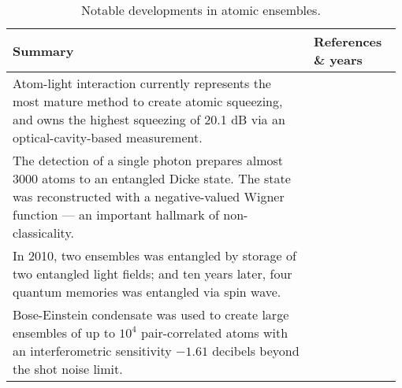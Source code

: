 \begin{table*}[!htbp]
	\begin{tabular}{|p{0.755\linewidth}|p{0.22\linewidth}|}
		\hline
		Summary & References \& years \\
		\hline \hline
		Atom-light interaction currently represents the most mature method to create atomic squeezing, and owns the highest squeezing of 20.1 dB via an optical-cavity-based measurement. & \cite{bib:hosten2016measurement} \\
		\hline
		The detection of a single photon prepares almost 3000 atoms to an entangled Dicke state. The state was reconstructed with a negative-valued Wigner function --- an important hallmark of non-classicality. &  \cite{bib:mcconnell2015entanglement} \\
		\hline
		In 2010, two ensembles was entangled by storage of two entangled light fields; and ten years later, four quantum memories was entangled via spin wave. & \cite{bib:lukin2000entanglement, bib:choi2010entanglement} \\
		\hline
		Bose-Einstein condensate was used to create large ensembles of up to ${10^4}$ pair-correlated atoms with an interferometric sensitivity $-1.61$ decibels beyond the shot noise limit. & \cite{bib:lucke2011twin} \\
		\hline
	\end{tabular}
	\captionspacetab \caption{Notable developments in atomic ensembles.} \label{tab:atomic_ensembles}
\end{table*}

